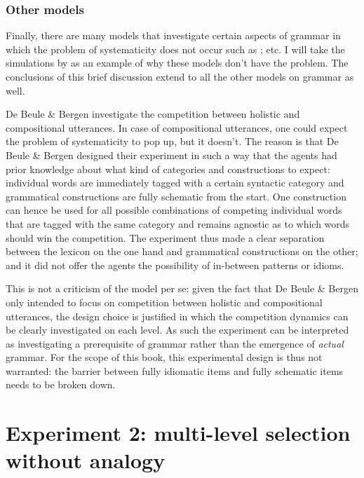 \subsubsection{Other models}
 Finally, there are many models that investigate certain aspects of grammar in which the problem of systematicity does not occur such as \citet{debeule07compositionality, debeule06emergence, nowak99evolution, steels06how-grammar}; etc. I will take the simulations by \citet{debeule06emergence} as an example of why these models don't have the problem. The conclusions of this brief discussion extend to all the other models on grammar as well.

De Beule \& Bergen investigate the competition between holistic and compositional utterances. In case of compositional utterances, one could expect the problem of systematicity to pop up, but it doesn't. The reason is that De Beule \& Bergen designed their experiment in such a way that the agents had prior knowledge about what kind of categories and constructions to expect: individual words are immediately tagged with a certain syntactic category and grammatical constructions are fully schematic from the start. One construction can hence be used for all possible combinations of competing individual words that are tagged with the same category and remains agnostic as to which words should win the competition. The experiment thus made a clear separation between the lexicon on the one hand and grammatical constructions on the other; and it did not offer the agents the possibility of in-between patterns or idioms.

This is not a criticism of the model per se: given the fact that De Beule \& Bergen only intended to focus on competition between holistic and compositional utterances, the design choice is justified in which the competition dynamics can be clearly investigated on each level. As such the experiment can be interpreted as investigating a prerequisite of grammar rather than the emergence of {\em actual} grammar. For the scope of this book, this experimental design is thus not warranted: the barrier between fully idiomatic items and fully schematic items needs to be broken down.

\section{Experiment 2: multi-level selection without analogy}
\label{s:pattern-exp-2}

